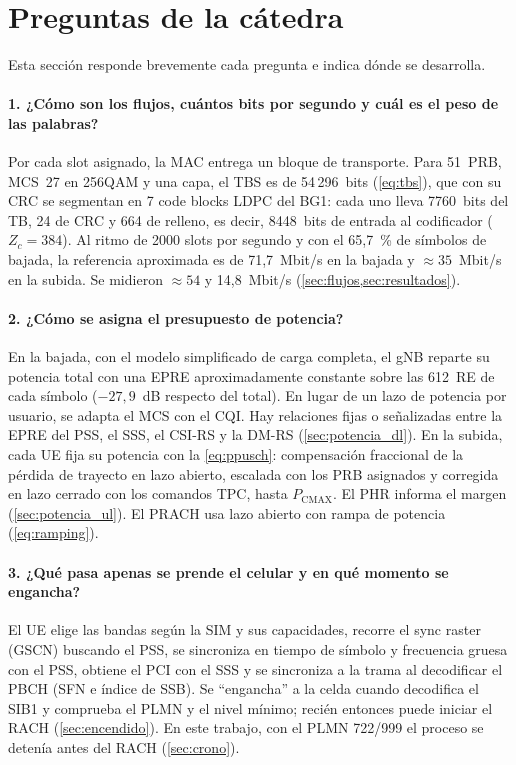 \section{Preguntas de la cátedra}\label{sec:preguntas}

Esta sección responde brevemente cada pregunta e indica dónde se desarrolla.

\paragraph{1. ¿Cómo son los flujos, cuántos bits por segundo y cuál es el peso de las palabras?}
Por cada slot asignado, la MAC entrega un bloque de transporte. Para 51~PRB, MCS~27 en 256QAM y una capa, el TBS es de 54\,296~bits (\cref{eq:tbs}), que con su CRC se segmentan en 7 code blocks LDPC del BG1: cada uno lleva 7760~bits del TB, 24 de CRC y 664 de relleno, es decir, 8448~bits de entrada al codificador ($Z_c=384$). Al ritmo de 2000 slots por segundo y con el 65,7~\% de símbolos de bajada, la referencia aproximada es de 71,7~Mbit/s en la bajada y $\approx 35$~Mbit/s en la subida. Se midieron $\approx 54$ y 14,8~Mbit/s (\cref{sec:flujos,sec:resultados}).

\paragraph{2. ¿Cómo se asigna el presupuesto de potencia?}
En la bajada, con el modelo simplificado de carga completa, el gNB reparte su potencia total con una EPRE aproximadamente constante sobre las 612~RE de cada símbolo ($-27{,}9$~dB respecto del total). En lugar de un lazo de potencia por usuario, se adapta el MCS con el CQI. Hay relaciones fijas o señalizadas entre la EPRE del PSS, el SSS, el CSI-RS y la DM-RS (\cref{sec:potencia_dl}). En la subida, cada UE fija su potencia con la \cref{eq:ppusch}: compensación fraccional de la pérdida de trayecto en lazo abierto, escalada con los PRB asignados y corregida en lazo cerrado con los comandos TPC, hasta $P_\text{CMAX}$. El PHR informa el margen (\cref{sec:potencia_ul}). El PRACH usa lazo abierto con rampa de potencia (\cref{eq:ramping}).

\paragraph{3. ¿Qué pasa apenas se prende el celular y en qué momento se engancha?}
El UE elige las bandas según la SIM y sus capacidades, recorre el sync raster (GSCN) buscando el PSS, se sincroniza en tiempo de símbolo y frecuencia gruesa con el PSS, obtiene el PCI con el SSS y se sincroniza a la trama al decodificar el PBCH (SFN e índice de SSB). Se ``engancha'' a la celda cuando decodifica el SIB1 y comprueba el PLMN y el nivel mínimo; recién entonces puede iniciar el RACH (\cref{sec:encendido}). En este trabajo, con el PLMN 722/999 el proceso se detenía antes del RACH (\cref{sec:crono}).

